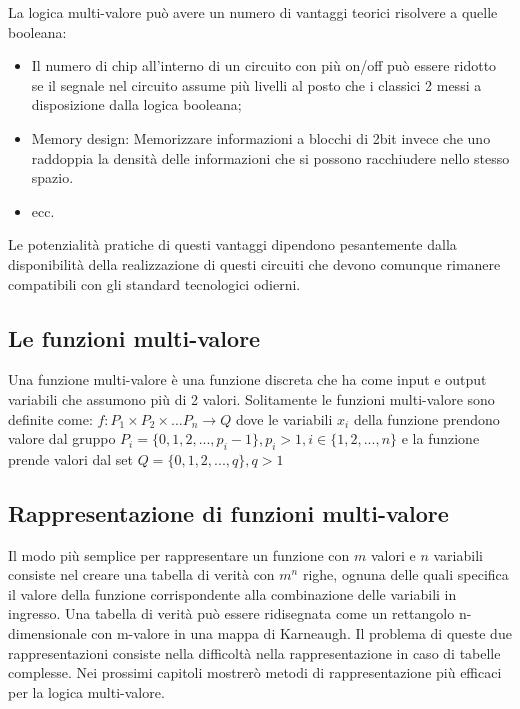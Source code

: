 \documentclass[italian,]{book}
\providecommand{\tightlist}{%
  \setlength{\itemsep}{0pt}\setlength{\parskip}{0pt}}
\begin{document}
La logica multi-valore può avere un numero di vantaggi teorici risolvere a quelle booleana:

\begin{itemize}
\tightlist
\item
  Il numero di chip all'interno di un circuito con più on/off può essere ridotto se il segnale nel circuito assume più livelli al posto che i classici 2 messi a disposizione dalla logica booleana;
\item
  Memory design: Memorizzare informazioni a blocchi di 2bit invece che uno raddoppia la densità delle informazioni che si possono racchiudere nello stesso spazio.
\item
  ecc.
\end{itemize}

Le potenzialità pratiche di questi vantaggi dipendono pesantemente dalla disponibilità della realizzazione di questi circuiti che devono comunque rimanere compatibili con gli standard tecnologici odierni.

\newpage

\hypertarget{le-funzioni-multi-valore}{%
\subsection{Le funzioni multi-valore}\label{le-funzioni-multi-valore}}

Una funzione multi-valore è una funzione discreta che ha come input e output variabili che assumono più di 2 valori. Solitamente le funzioni multi-valore sono definite come: \(f: P_1 \times P_2 \times ... P_n \rightarrow Q\) dove le variabili \(x_i\) della funzione prendono valore dal gruppo \(P_i = \{ 0,1,2,...,p_i-1 \}, p_i > 1 , i \in \{ 1,2,...,n\}\) e la funzione prende valori dal set \(Q = \{0,1,2,...,q\}, q>1\)

\hypertarget{rappresentazione-di-funzioni-multi-valore}{%
\subsection{Rappresentazione di funzioni multi-valore}\label{rappresentazione-di-funzioni-multi-valore}}

Il modo più semplice per rappresentare un funzione con \(m\) valori e \(n\) variabili consiste nel creare una tabella di verità con \(m^n\) righe, ognuna delle quali specifica il valore della funzione corrispondente alla combinazione delle variabili in ingresso. Una tabella di verità può essere ridisegnata come un rettangolo n-dimensionale con m-valore in una mappa di Karneaugh. Il problema di queste due rappresentazioni consiste nella difficoltà nella rappresentazione in caso di tabelle complesse. Nei prossimi capitoli mostrerò metodi di rappresentazione più efficaci per la logica multi-valore.
\end{document}
